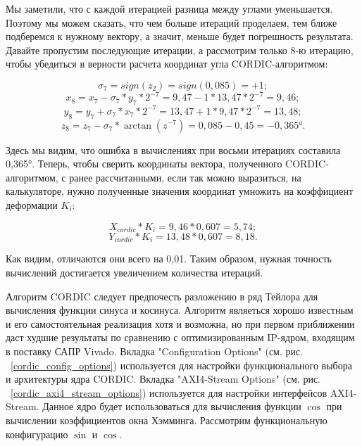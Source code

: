 \documentclass[a4paper,oneside ,14pt]{extreport}
\begin{document}
Мы заметили, что с каждой итерацией разница между углами уменьшается. Поэтому 
мы можем сказать, что чем больше итераций 
проделаем, тем ближе подберемся к нужному 
вектору, а значит, меньше будет погрешность 
результата.
Давайте пропустим последующие итерации, а рассмотрим только 8‑ю итерацию, 
чтобы убедиться в верности расчета координат угла CORDIC-алгоритмом:

\begin{displaymath}	
\sigma_7 = sign(z_2) = sign(0,085) = + 1;
\end{displaymath}
\begin{displaymath}	
x_{8} = x_{7} - \sigma_7*y_7*2^{-7} = 9,47 - 1*13,47*2^{-7} = 9,46;
\end{displaymath}
\begin{displaymath}
y_{8} = y_{7} + \sigma_7*x_7*2^{-7} = 13,47 + 1*9,47*2^{-7} = 13,48;
\end{displaymath}
\begin{displaymath}	
z_{8} = z_{7} - \sigma_7*\arctan(z^{-7}) = 0,085 - 0,45 = -0,365°.
\end{displaymath}

Здесь мы видим, что ошибка в вычислениях при восьми итерациях составила 0,365°.
Теперь, чтобы сверить координаты вектора, полученного CORDIC-алгоритмом, с ранее рассчитанными, если так можно выразиться, на калькуляторе, нужно полученные значения координат умножить на коэффициент деформации \(K_i\):

\begin{displaymath}
X_{cordic} * K_i = 9,46*0,607 = 5,74;
\end{displaymath}
\begin{displaymath}	
Y_{cordic} * K_i= 13,48 * 0,607 = 8,18.
\end{displaymath}

Как видим, отличаются они всего на 0,01. Таким образом, нужная точность вычислений 
достигается увеличением количества итераций.

Алгоритм CORDIC следует предпочесть разложению в ряд Тейлора для вычисления функции синуса и косинуса. Алгоритм являеться хорошо известным и его самостоятельная реализация хотя и возможна, но при первом приближении даст худшие результаты по сравнению с оптимизированным IP-ядром, входящим в поставку САПР Vivado. Вкладка "Configuration Options" (см. рис. ~\ref{cordic_config_options}) используется для настройки функционального выбора и архитектуры ядра CORDIC. Вкладка "AXI4-Stream Options" (см. рис. ~\ref{cordic_axi4_stream_options}) используется для настройки интерфейсов AXI4-Stream. Данное ядро будет использоваться для вычисления функции \(\cos\) при вычислении коэффициентов окна Хэмминга. Рассмотрим функциональную конфигурацию \(\sin\) и \(\cos\).
\end{document}
